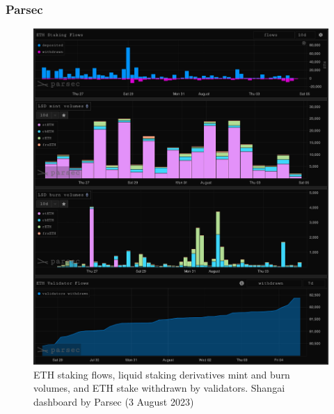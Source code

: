 \documentclass[UTF8]{article}
\begin{document}
{\subsubsection*{Parsec}
\begin{figure}[htbp]
\begin{center}
\includegraphics[width=0.8\linewidth]{images/parsec1}
\caption{ETH staking flows, liquid staking derivatives mint and burn volumes, and ETH stake withdrawn by validators. Shangai dashboard by Parsec (3 August 2023)}
\label{fig:parsec1}
\end{center}
\end{figure}

}
\end{document}
